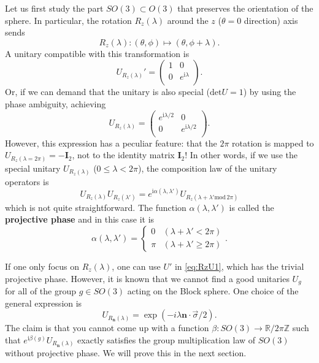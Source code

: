 \documentclass[
]{scrartcl}
\numberwithin{equation}{section}
\theoremstyle{definition}
\theoremstyle{definition}
\theoremstyle{definition}
\theoremstyle{definition}
\theoremstyle{remark}
\begin{document}
Let us first study the part \(SO(3) \subset O(3)\) that preserves the orientation of the sphere.
In particular, the rotation \(R_z(\lambda)\) around the \(z\) (\(\theta =0\) direction) axis sends
\begin{equation}
  \label{eq:Rz}
  R_z(\lambda) : (\theta ,\phi) \mapsto (\theta, \phi + \lambda).
\end{equation}
A unitary compatible with this transformation is
\begin{equation}
  \label{eq:RzU1}
  U_{R_z(\lambda)}' = 
  \begin{pmatrix}
  1 & 0 \\
  0 & e^{\mathrm{i}\lambda}\\
  \end{pmatrix}.
\end{equation}
Or, if we can demand that the unitary is also special (\(\mathrm{det}U =1\)) by using the phase ambiguity,
achieving
\begin{equation}
  \label{eq:RzU2}
  U_{R_z(\lambda)} = 
  \begin{pmatrix}
  e^{\mathrm{i}\lambda/2} & 0 \\
  0 & e^{\mathrm{i}\lambda/2}\\
  \end{pmatrix}.
\end{equation}
However, this expression has a peculiar feature:
that the \(2\pi\) rotation is mapped to \(U_{R_z(\lambda = 2\pi)} = -\mathbf{I}_{2}\), not to the identity matrix \(\mathbf{I}_2\)!
In other words, if we use the special unitary \(U_{R_z(\lambda)}\) (\(0\le \lambda < 2\pi\)), the composition law of the unitary operators is
\begin{equation}
  \label{eq:UUprod}
  U_{R_z(\lambda)} U_{R_z(\lambda')} = e^{\mathrm{i}\alpha(\lambda,\lambda')}U_{R_z(\lambda+\lambda' \mathrm{mod}\, 2\pi)}
\end{equation}
which is not quite straightforward. The function \(\alpha(\lambda,\lambda')\) is called the \textbf{projective phase} and in this case it is
\begin{equation}
  \label{eq:projphaseRz}
  \alpha(\lambda,\lambda')=
    \begin{cases}
      0 & (\lambda+\lambda' < 2\pi)\\
      \pi & (\lambda+\lambda' \ge 2\pi)
    \end{cases}.
\end{equation}

If one only focus on \(R_z(\lambda)\), one can use \(U'\) in \eqref{eq:RzU1}, which has the trivial projective phase.
However, it is known that we cannot find a good unitaries \(U_g\) for all of the group \(g\in SO(3)\) acting on the Block sphere. One choice of the general expression is
\begin{equation}
  \label{eq:generalRot}
  U_{R_{\mathbf{n}}(\lambda)}  = \exp(-i\lambda \mathbf{n}\cdot \vec{\sigma}/2).
\end{equation}
The claim is that you cannot come up with a function \(\beta: SO(3) \to \mathbb{R}/2\pi\mathbb{Z}\) such that \(e^{\mathrm{i}\beta(g)}U_{R_{\mathbf{n}}(\lambda)}\) exactly satisfies the group multiplication law of \(SO(3)\) without projective phase.
We will prove this in the next section.
\end{document}
